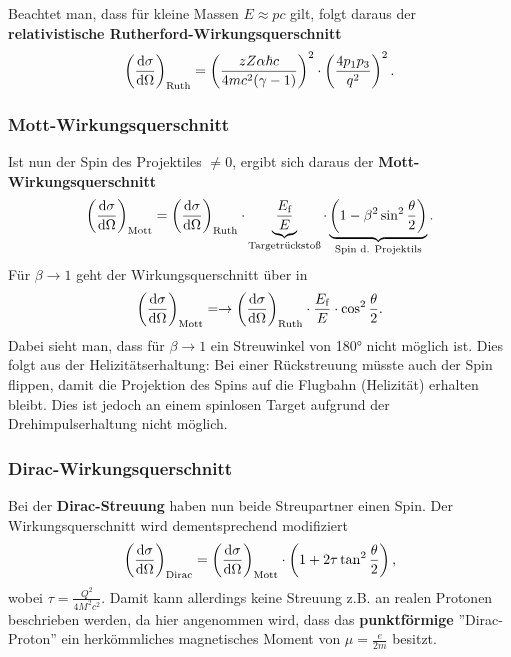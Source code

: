 Beachtet man, dass für kleine Massen $E\approx pc$ gilt, folgt daraus der \textbf{relativistische Rutherford-Wirkungsquerschnitt}
\begin{equation*}
	\left(\diff[\sigma]{\Omega}\right)_\text{Ruth} = \left(\frac{zZ\alpha\hbar c}{4mc^2(\gamma-1)}\right)^2\cdot\left(\frac{4p_1p_3}{q^2}\right)^2.
\end{equation*}

\subsubsection{Mott-Wirkungsquerschnitt}
Ist nun der Spin des Projektiles $\neq 0$, ergibt sich daraus der \textbf{Mott-Wirkungsquerschnitt}
\begin{equation*}
	\left(\diff[\sigma]{\Omega}\right)_\text{Mott} = \left(\diff[\sigma]{\Omega}\right)_\text{Ruth}\cdot\underbrace{\frac{E_\text{f}}{E}}_\text{Targetrückstoß}\cdot\underbrace{\left(1-\beta^2\sin^2\frac{\theta}{2}\right)}_\text{Spin d. Projektils}.
\end{equation*}
Für $\beta\rightarrow 1$ geht der Wirkungsquerschnitt über in
\begin{equation*}
	\left(\diff[\sigma]{\Omega}\right)_\text{Mott}= \rightarrow\left(\diff[\sigma]{\Omega}\right)_\text{Ruth}\cdot\frac{E_\text{f}}{E}\cdot\cos^2\frac{\theta}{2}.
\end{equation*}
Dabei sieht man, dass für $\beta\rightarrow 1$ ein Streuwinkel von 180° nicht möglich ist.
Dies folgt aus der Helizitätserhaltung: Bei einer Rückstreuung müsste auch der Spin flippen, damit die Projektion des Spins auf die Flugbahn (Helizität) erhalten bleibt. Dies ist jedoch an einem spinlosen Target aufgrund der Drehimpulserhaltung nicht möglich.

\subsubsection{Dirac-Wirkungsquerschnitt}
Bei der \textbf{Dirac-Streuung} haben nun beide Streupartner einen Spin.
Der Wirkungsquerschnitt wird dementsprechend modifiziert
\begin{equation*}
	\left(\diff[\sigma]{\Omega}\right)_\text{Dirac} = \left(\diff[\sigma]{\Omega}\right)_\text{Mott}\cdot\left(1+2\tau\tan^2\frac{\theta}{2}\right),
\end{equation*}
wobei $\tau = \frac{Q^2}{4M^2c^2}$.
Damit kann allerdings keine Streuung z.B. an realen Protonen beschrieben werden, da hier angenommen wird, dass das \textbf{punktförmige} ''Dirac-Proton'' ein herkömmliches magnetisches Moment von $\mu=\frac{e}{2m}$ besitzt.

